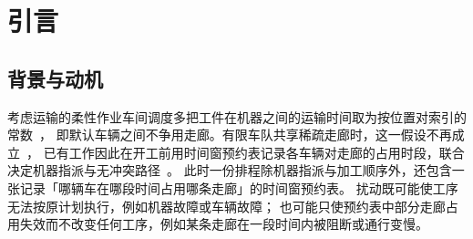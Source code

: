 \documentclass[manuscript,screen,review]{acmart}
\newcommand{\ClosureAliveFrac}{92\%}
\begin{document}
\begin{abstract}
由此可见，可行性的恢复来自划界对象的替换：改路程序未变，划界对象由工序依赖图换为预约影响集后，可行性即得以恢复。
改写量的减少则来自预约影响集比「尚未结束的全部占用」更小；但实测中前者平均已占后者的约 \ClosureAliveFrac，
只排除了不到一成的占用，因而减少幅度有限，在影响集接近全部尚未结束占用的算例上，二者几乎重合，这一减少也随之消失。
在集内改路、集外保持原计划以及修复失败后扩大可改写范围，均沿用已有的局部重调度做法；
本文的贡献在于重新确定重调度范围应划定在哪一类对象上，即以走廊占用构成的预约影响集取代工序集合。
\end{abstract}



\maketitle

\section{引言}
\label{sec:introduction}

\subsection{背景与动机}

考虑运输的柔性作业车间调度多把工件在机器之间的运输时间取为按位置对索引的常数~\cite{xin2025review,meng2025cp,qin2026knowledge}，
即默认车辆之间不争用走廊。有限车队共享稀疏走廊时，这一假设不再成立~\cite{kim2026congestion}，
已有工作因此在开工前用时间窗预约表记录各车辆对走廊的占用时段，联合决定机器指派与无冲突路径~\cite{vanos2026exact,sun2023integrated,lyu2019approach,li2026framework}。
此时一份排程除机器指派与加工顺序外，还包含一张记录「哪辆车在哪段时间占用哪条走廊」的时间窗预约表。
扰动既可能使工序无法按原计划执行，例如机器故障或车辆故障；
也可能只使预约表中部分走廊占用失效而不改变任何工序，例如某条走廊在一段时间内被阻断或通行变慢。
\end{document}
